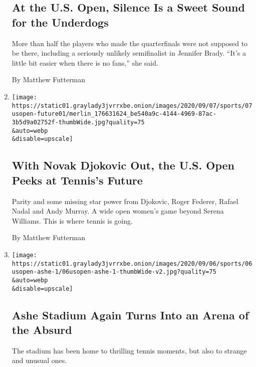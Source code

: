 \begin{enumerate}
{  \subsection{At the U.S. Open, Silence Is a Sweet Sound for the
  Underdogs}\label{at-the-us-open-silence-is-a-sweet-sound-for-the-underdogs}}

  More than half the players who made the quarterfinals were not
  supposed to be there, including a seriously unlikely semifinalist in
  Jennifer Brady. ``It's a little bit easier when there is no fans,''
  she said.

  By Matthew Futterman
\item
  \href{/2020/09/07/sports/tennis/us-open-tennis-future-novak-djokovic.html}{}

  \texttt{[image: https://static01.graylady3jvrrxbe.onion/images/2020/09/07/sports/07usopen-future01/merlin\_176631624\_be540a9c-4144-4969-87ac-3b5d9a02752f-thumbWide.jpg?quality=75\\\&auto=webp\\\&disable=upscale]}

  \hypertarget{with-novak-djokovic-out-the-us-open-peeks-at-tenniss-future}{%
  \subsection{With Novak Djokovic Out, the U.S. Open Peeks at Tennis's
  Future}\label{with-novak-djokovic-out-the-us-open-peeks-at-tenniss-future}}

  Parity and some missing star power from Djokovic, Roger Federer,
  Rafael Nadal and Andy Murray. A wide open women's game beyond Serena
  Williams. This is where tennis is going.

  By Matthew Futterman
\item
  \href{/2020/09/06/sports/tennis/djokovic-us-open-moments.html}{}

  \texttt{[image: https://static01.graylady3jvrrxbe.onion/images/2020/09/06/sports/06usopen-ashe-1/06usopen-ashe-1-thumbWide-v2.jpg?quality=75\\\&auto=webp\\\&disable=upscale]}

  \hypertarget{ashe-stadium-again-turns-into-an-arena-of-the-absurd}{%
  \subsection{Ashe Stadium Again Turns Into an Arena of the
  Absurd}\label{ashe-stadium-again-turns-into-an-arena-of-the-absurd}}

  The stadium has been home to thrilling tennis moments, but also to
  strange and unusual ones.


\end{enumerate}
